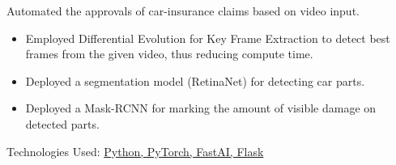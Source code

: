 \documentclass[10pt,a4paper,ragged2e]{altacv}
\begin{document}

\begin{fullwidth}
\makecvheader
\end{fullwidth}



Automated the approvals of car-insurance claims based on video input.
\begin{itemize}
    \item Employed Differential Evolution for Key Frame Extraction to detect best frames from the given video, thus reducing compute time.
    \item Deployed a segmentation model (RetinaNet) for detecting car parts.
    \item Deployed a Mask-RCNN for marking the amount of visible damage on detected parts.
\end{itemize}
Technologies Used: \underline{Python, PyTorch, FastAI, Flask}

\divider
\end{document}
